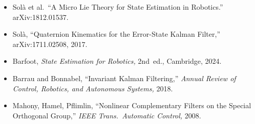 \documentclass[11pt,letterpaper]{article}
\begin{document}
\begin{itemize}[nosep,leftmargin=*]
  \item Sol\`{a} et al.\ ``A Micro Lie Theory for State
    Estimation in Robotics.'' arXiv:1812.01537.
  \item Sol\`{a}, ``Quaternion Kinematics for the Error-State
    Kalman Filter,'' arXiv:1711.02508, 2017.
  \item Barfoot, \emph{State Estimation for Robotics,} 2nd~ed.,
    Cambridge, 2024.
  \item Barrau and Bonnabel, ``Invariant Kalman Filtering,''
    \emph{Annual Review of Control, Robotics, and Autonomous
    Systems,} 2018.
  \item Mahony, Hamel, Pflimlin, ``Nonlinear Complementary Filters
    on the Special Orthogonal Group,'' \emph{IEEE Trans.\ Automatic
    Control,} 2008.
\end{itemize}
\end{document}

